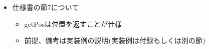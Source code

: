 \begin{itemize}

\item 仕様書の節7について

  \begin{itemize}
  \item getPosは位置を返すことが仕様
  \item 前提、備考は実装例の説明(実装例は付録もしくは別の節)
  \end{itemize}

\end{itemize}
